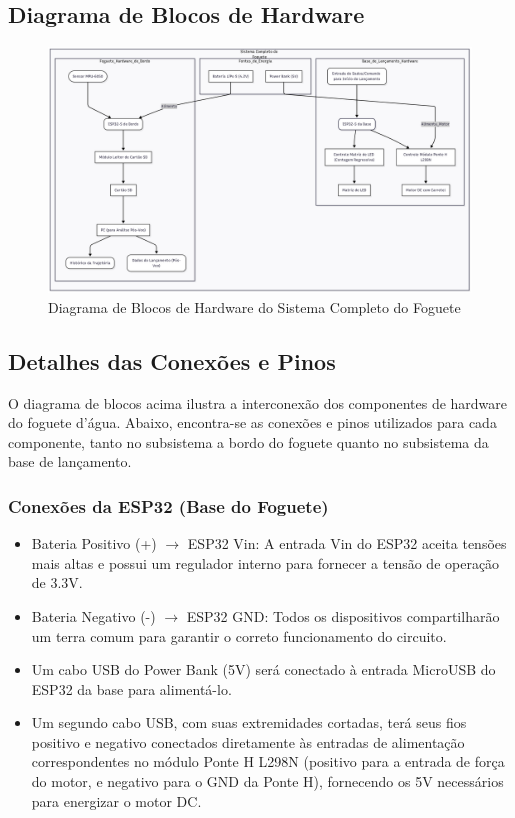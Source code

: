 \subsection{Diagrama de Blocos de Hardware}
\begin{figure}[H]
    \centering
    \includegraphics[width=\linewidth]{figuras/hardware/diagramaDeBlocos.png}
    \caption{Diagrama de Blocos de Hardware do Sistema Completo do Foguete}
    \label{fig:diagrama_blocos_embarcado}
\end{figure}

\subsection{Detalhes das Conexões e Pinos}
O diagrama de blocos acima ilustra a interconexão dos componentes de hardware do foguete d'água. Abaixo, encontra-se as conexões e pinos utilizados para cada componente, tanto no subsistema a bordo do foguete quanto no subsistema da base de lançamento.

\subsubsection{Conexões da ESP32 (Base do Foguete)}

\begin{itemize}
    \item Bateria Positivo (+) $\rightarrow$ ESP32 Vin: A entrada Vin do ESP32 aceita tensões mais altas e possui um regulador interno para fornecer a tensão de operação de 3.3V. 
    \item Bateria Negativo (-) $\rightarrow$ ESP32 GND: Todos os dispositivos compartilharão um terra comum para garantir o correto funcionamento do circuito.
    \item Um cabo USB do Power Bank (5V) será conectado à entrada MicroUSB do ESP32 da base para alimentá-lo. 
    \item Um segundo cabo USB, com suas extremidades cortadas, terá seus fios positivo e negativo conectados diretamente às entradas de alimentação correspondentes no módulo Ponte H L298N (positivo para a entrada de força do motor, e negativo para o GND da Ponte H), fornecendo os 5V necessários para energizar o motor DC.
\end{itemize}

